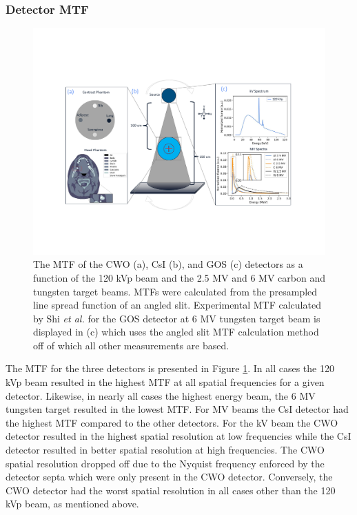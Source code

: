 \subsubsection{Detector MTF}
\begin{figure}[ht]
    \centering
   \centerline{\includegraphics[width=0.9\linewidth]{figures/Figure_1.pdf}}
  \caption{The MTF of the CWO (a), CsI (b), and GOS (c) detectors as a function of the 120 kVp beam and the 2.5 MV and 6 MV carbon and tungsten target beams. MTFs were calculated from the presampled line spread function of an angled slit. Experimental MTF calculated by Shi \textit{et al.} \cite{Shi2019ADetectors.} for the GOS detector at 6 MV tungsten target beam is displayed in (c) which uses the angled slit MTF calculation method off of which all other measurements are based.
    }  %
    \label{fig_mtf}
    \centering
\end{figure}

The MTF for the three detectors is presented in Figure \ref{fig_mtf}.  In all cases the 120 kVp beam resulted in the highest MTF at all spatial frequencies for a given detector. Likewise, in nearly all cases the highest energy beam, the 6 MV tungsten target resulted in the lowest MTF. For MV beams the CsI detector had the highest MTF compared to the other detectors. For the kV beam the CWO detector resulted in the highest spatial resolution at low frequencies while the CsI detector resulted in better spatial resolution at high frequencies. The CWO spatial resolution dropped off due to the Nyquist frequency enforced by the detector septa which were only present in the CWO detector. Conversely, the CWO detector had the worst spatial resolution in all cases other than the 120 kVp beam, as mentioned above.


